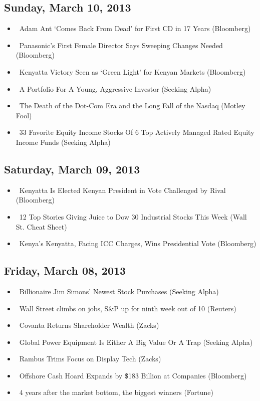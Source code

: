 \documentclass[11pt,asymmetric]{article}
\begin{document}
\subsection*{Sunday, March 10, 2013}
\begin{itemize}
\item\ Adam Ant ‘Comes Back From Dead’ for First CD in 17 Years (Bloomberg)
\item\ Panasonic’s First Female Director Says Sweeping Changes Needed (Bloomberg)
\item\ Kenyatta Victory Seen as ‘Green Light’ for Kenyan Markets (Bloomberg)
\item\ A Portfolio For A Young, Aggressive Investor (Seeking Alpha)
\item\ The Death of the Dot-Com Era and the Long Fall of the Nasdaq (Motley Fool)
\item\ 33 Favorite Equity Income Stocks Of 6 Top Actively Managed Rated Equity Income Funds (Seeking Alpha)
\end{itemize}
\subsection*{Saturday, March 09, 2013}
\begin{itemize}
\item\ Kenyatta Is Elected Kenyan President in Vote Challenged by Rival (Bloomberg)
\item\ 12 Top Stories Giving Juice to Dow 30 Industrial Stocks This Week (Wall St. Cheat Sheet)
\item\ Kenya’s Kenyatta, Facing ICC Charges, Wins Presidential Vote (Bloomberg)
\end{itemize}
\subsection*{Friday, March 08, 2013}
\begin{itemize}
\item\ Billionaire Jim Simons' Newest Stock Purchases (Seeking Alpha)
\item\ Wall Street climbs on jobs, S\&P up for ninth week out of 10 (Reuters)
\item\ Covanta Returns Shareholder Wealth (Zacks)
\item\ Global Power Equipment Is Either A Big Value Or A Trap (Seeking Alpha)
\item\ Rambus Trims Focus on Display Tech (Zacks)
\item\ Offshore Cash Hoard Expands by \$183 Billion at Companies (Bloomberg)
\item\ 4 years after the market bottom, the biggest winners (Fortune)
\end{itemize}
\end{document}
